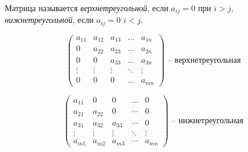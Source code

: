 \begin{definition}
    Матрица называется \textit{верхнетреугольной}, если $a_{ij} = 0$ при $i > j$, \textit{нижнетреугольной}, если $a_{ij} = 0$ $i < j$.
\end{definition}
\begin{equation*}
    \begin{pmatrix}
        a_{11} & a_{12} & a_{13} & \dots & a_{1n} \\
        0 & a_{22} & a_{23} & \dots & a_{2n} \\
        0 & 0 & a_{33} & \dots & a_{3n} \\
        \vdots & \vdots & \vdots & \ddots & \vdots \\
        0 & 0 & 0 & \dots & a_{mn}
    \end{pmatrix} \text{ -- верхнетреугольная}
\end{equation*}

\begin{equation*}
    \begin{pmatrix}
        a_{11} & 0 & 0 & \dots & 0 \\
        a_{21} & a_{22} & 0 & \cdots & 0 \\
        a_{31} & a_{32} & a_{33} & \cdots & 0 \\
        \vdots & \vdots & \vdots & \ddots & \vdots \\
        a_{m1} & a_{m2} & a_{m3} & \cdots & a_{mn}
    \end{pmatrix} \text{ -- нижнетреугольная}
\end{equation*}

\begin{comment}
    Всякая ступенчатая квадратная матрица верхнетреугольна.
\end{comment}

